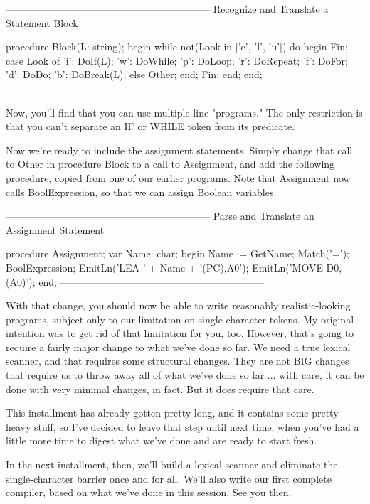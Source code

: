 \documentclass[float=false, crop=false]{standalone}
\begin{document}
\begin{code}
{--------------------------------------------------------------}
{ Recognize and Translate a Statement Block }

procedure Block(L: string);
begin
   while not(Look in ['e', 'l', 'u']) do begin
      Fin;
      case Look of
       'i': DoIf(L);
       'w': DoWhile;
       'p': DoLoop;
       'r': DoRepeat;
       'f': DoFor;
       'd': DoDo;
       'b': DoBreak(L);
       else Other;
      end;
      Fin;
 end;
end;
{--------------------------------------------------------------}
\end{code}

Now, you'll find that you can use multiple-line "programs." The only restriction
is that you can't separate an IF or WHILE token from its predicate.

Now we're ready to include the assignment statements. Simply change that call to
Other in procedure Block to a call to Assignment, and add the following
procedure, copied from one of our earlier programs. Note that Assignment now
calls BoolExpression, so that we can assign Boolean variables.

\begin{code}
{--------------------------------------------------------------}
{ Parse and Translate an Assignment Statement }

procedure Assignment;
var Name: char;
begin
   Name := GetName;
   Match('=');
   BoolExpression;
   EmitLn('LEA ' + Name + '(PC),A0');
   EmitLn('MOVE D0,(A0)');
end;
{--------------------------------------------------------------}
\end{code}

With that change, you should now be able to write reasonably realistic-looking
programs, subject only to our limitation on single-character tokens. My original
intention was to get rid of that limitation for you, too. However, that's going
to require a fairly major change to what we've done so far. We need a true
lexical scanner, and that requires some structural changes. They are not BIG
changes that require us to throw away all of what we've done so far ... with
care, it can be done with very minimal changes, in fact. But it does require
that care.

This installment has already gotten pretty long, and it contains some pretty
heavy stuff, so I've decided to leave that step until next time, when you've had
a little more time to digest what we've done and are ready to start fresh.

In the next installment, then, we'll build a lexical scanner and eliminate the
single-character barrier once and for all. We'll also write our first complete
compiler, based on what we've done in this session. See you then.
\end{document}
